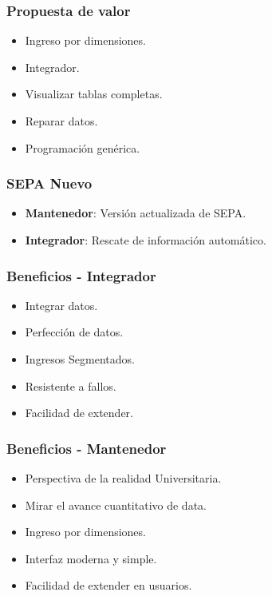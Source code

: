 \documentclass{beamer}
\begin{document}

\begin{frame}
\frametitle{Propuesta de valor}
\begin{itemize}
\item Ingreso por dimensiones.
\item Integrador.
\item Visualizar tablas completas.
\item Reparar datos.
\item Programación genérica.
\end{itemize}
\end{frame}


\begin{frame}
\frametitle{SEPA Nuevo}
\begin{itemize}
\item \textbf{Mantenedor}: Versión actualizada de SEPA.
\item \textbf{Integrador}: Rescate de información automático.
\end{itemize}
\end{frame}


\begin{frame}
\frametitle{Beneficios - Integrador}
\begin{itemize}
\item Integrar datos.
\item Perfección de datos.
\item Ingresos Segmentados.
\item Resistente a fallos.
\item Facilidad de extender.
\end{itemize}
\end{frame}


\begin{frame}
\frametitle{Beneficios - Mantenedor}
\begin{itemize}
\item Perspectiva de la realidad Universitaria.
\item Mirar el avance cuantitativo de data.
\item Ingreso por dimensiones.
\item Interfaz moderna y simple.
\item Facilidad de extender en usuarios.
\end{itemize}
\end{frame}
\end{document}
